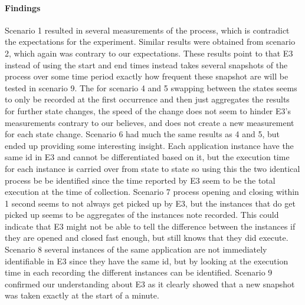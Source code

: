 \paragraph {Findings}
Scenario 1 resulted in several measurements of the process, which is contradict the expectations for the experiment. Similar results were obtained from scenario 2, which again was contrary to our expectations. These results point to that E3 instead of using the start and end times instead takes several snapshots of the process over some time period exactly how frequent these snapshot are will be tested in scenario 9. The for scenario 4 and 5 swapping between the states seems to only be recorded at the first occurrence and then just aggregates the results for further state changes, the speed of the change does not seem to hinder E3's measurements contrary to our believes, and does not create a new measurement for each state change. Scenario 6 had much the same results as 4 and 5, but ended up providing some interesting insight. Each application instance have the same id in E3 and cannot be differentiated based on it, but the execution time for each instance is carried over from state to state so using this the two identical process be be identified since the time reported by E3 seem to be the total execution at the time of collection. Scenario 7 process opening and closing within 1 second seems to not always get picked up by E3, but the instances that do get picked up seems to be aggregates of the instances note recorded. This could indicate that E3 might not be able to tell the difference between the instances if they are opened and closed fast enough, but still knows that they did execute. Scenario 8 several instances of the same application are not immediately identifiable in E3 since they have the same id, but by looking at the execution time in each recording the different instances can be identified. Scenario 9 confirmed our understanding about E3 as it clearly showed that a new snapshot was taken exactly at the start of a minute.

